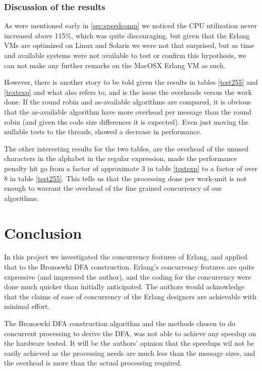 \documentclass[a4paper,11pt]{report}
\begin{document}
\subsection{Discussion of the results}
\label{sec:discresults}

As were mentioned early in \autoref{sec:speedcomp} we noticed the CPU
utilization never increased above 115\%, which was quite discouraging,
but given that the Erlang VMs are optimized on Linux and Solaris we
were not that surprised, but as time and available systems were
not available to test or confirm this hypothesis, we can not make any
further remarks on the MacOSX Erlang VM as such.

However, there is another story to be told given the results in tables
\autoref{test255} and \autoref{textexp} and what \cite{joe:09} also refers
to, and is the issue the overheads versus the work
done. If the round robin and as-available algorithms are compared, it
is obvious that the as-available algorithm have more overhead per
message than the round robin (and given the code size differences it
is expected). Even just moving the nullable tests to the threads,
showed a decrease in performance.

The other interesting results for the two tables, are the overhead of
the unused characters in the alphabet in the regular expression, made
the performance penalty hit go from a factor of approximate 3 in table
\autoref{testexp} to a factor of over 8 in table \autoref{test255}.  This
tells us that the processing done per work-unit is not enough to
warrant the overhead of the fine grained concurrency of our
algorithms.

\chapter{Conclusion}


In this project we investigated the concurrency features of Erlang,
and applied that to the Brozoswki DFA construction. Erlang's
concurrency features are quite expressive (and impressed the author),
and the coding for the concurrency were done much quicker than
initially anticipated. The authors would acknowledge that the claims of
ease of concurrency of the Erlang designers are achievable with
minimal effort.

The Brozoswki DFA construction algorithm and the methods chosen to do
concurrent processing to derive the DFA, was not able to achieve any
speedup on the hardware tested. It will be the authors' opinion that
the speedups wil not be easily achieved as the processing needs are
much less than the message sizes, and the overhead is more than the
actual processing required. 
\end{document}
